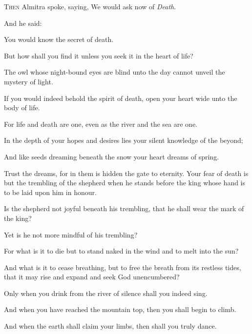 \lettrine{T}{hen} Almitra spoke, saying, We would
ask now of \textit{Death}.

\medskip
And he said:

You would know the secret of death.

But how shall you find it unless you
seek it in the heart of life?

The owl whose night-bound eyes are blind
unto the day cannot unveil the mystery
of light.

If you would indeed behold the spirit
of death, open your heart wide unto the
body of life.

For life and death are one, even as the
river and the sea are one.

In the depth of your hopes and desires
lies your silent knowledge of the
beyond;

And like seeds dreaming beneath the snow
your heart dreams of spring.

Trust the dreams, for in them is hidden
the gate to eternity. Your fear
of death is but the trembling of the
shepherd when he stands before the king
whose hand is to be laid upon him in
honour.

Is the shepherd not joyful beneath his
trembling, that he shall wear the mark
of the king?

Yet is he not more mindful of his
trembling?



For what is it to die but to stand naked
in the wind and to melt into the sun?

And what is it to cease breathing, but
to free the breath from its restless
tides, that it may rise and expand and
seek God unencumbered?

Only when you drink from the river of
silence shall you indeed sing.

And when you have reached the mountain
top, then you shall begin to climb.

And when the earth shall claim your
limbs, then shall you truly dance.
